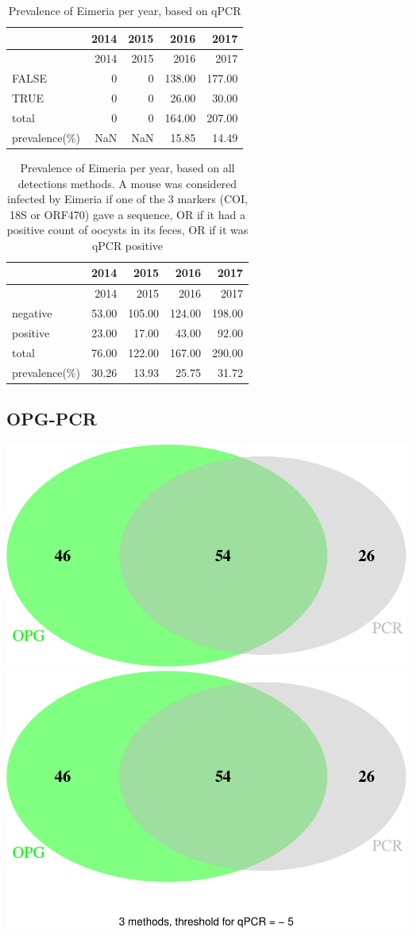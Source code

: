 \documentclass[]{article}
\begin{document}
\begin{longtable}[]{@{}lrrrr@{}}
\caption{Prevalence of Eimeria per year, based on qPCR}\tabularnewline
\toprule
& 2014 & 2015 & 2016 & 2017\tabularnewline
\midrule
\endfirsthead
\toprule
& 2014 & 2015 & 2016 & 2017\tabularnewline
\midrule
\endhead
FALSE & 0 & 0 & 138.00 & 177.00\tabularnewline
TRUE & 0 & 0 & 26.00 & 30.00\tabularnewline
total & 0 & 0 & 164.00 & 207.00\tabularnewline
prevalence(\%) & NaN & NaN & 15.85 & 14.49\tabularnewline
\bottomrule
\end{longtable}

\begin{longtable}[]{@{}lrrrr@{}}
\caption{Prevalence of Eimeria per year, based on all detections
methods. A mouse was considered infected by Eimeria if one of the 3
markers (COI, 18S or ORF470) gave a sequence, OR if it had a positive
count of oocysts in its feces, OR if it was qPCR
positive}\tabularnewline
\toprule
& 2014 & 2015 & 2016 & 2017\tabularnewline
\midrule
\endfirsthead
\toprule
& 2014 & 2015 & 2016 & 2017\tabularnewline
\midrule
\endhead
negative & 53.00 & 105.00 & 124.00 & 198.00\tabularnewline
positive & 23.00 & 17.00 & 43.00 & 92.00\tabularnewline
total & 76.00 & 122.00 & 167.00 & 290.00\tabularnewline
prevalence(\%) & 30.26 & 13.93 & 25.75 & 31.72\tabularnewline
\bottomrule
\end{longtable}

\subsection{OPG-PCR}\label{opg-pcr-1}

\includegraphics{Data_Analysis_Alice_files/figure-latex/opgpcr_3.75-1.pdf}
\includegraphics{Data_Analysis_Alice_files/figure-latex/opgpcr_3.75-2.pdf}
\end{document}

